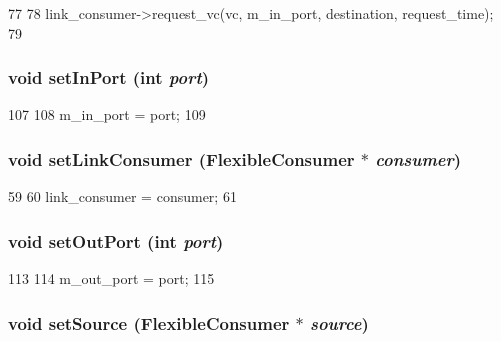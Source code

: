\begin{DoxyCode}
77 {
78     link_consumer->request_vc(vc, m_in_port, destination, request_time);
79 }
\end{DoxyCode}
\hypertarget{classNetworkLink_a1ec0cbfcb39559c3f6262ad360d910b4}{
\subsubsection[{setInPort}]{\setlength{\rightskip}{0pt plus 5cm}void setInPort (int {\em port})}}
\label{classNetworkLink_a1ec0cbfcb39559c3f6262ad360d910b4}



\begin{DoxyCode}
107 {
108     m_in_port = port;
109 }
\end{DoxyCode}
\hypertarget{classNetworkLink_ad25cd0a8bd8cc04be12bdcfee67aa808}{
\subsubsection[{setLinkConsumer}]{\setlength{\rightskip}{0pt plus 5cm}void setLinkConsumer ({\bf FlexibleConsumer} $\ast$ {\em consumer})}}
\label{classNetworkLink_ad25cd0a8bd8cc04be12bdcfee67aa808}



\begin{DoxyCode}
59 {
60     link_consumer = consumer;
61 }
\end{DoxyCode}
\hypertarget{classNetworkLink_a6e1fcbbdee4eeca176ab6b03b6c19ee9}{
\subsubsection[{setOutPort}]{\setlength{\rightskip}{0pt plus 5cm}void setOutPort (int {\em port})}}
\label{classNetworkLink_a6e1fcbbdee4eeca176ab6b03b6c19ee9}



\begin{DoxyCode}
113 {
114     m_out_port = port;
115 }
\end{DoxyCode}
\hypertarget{classNetworkLink_aa12b98c270affe16e12b505ffba35e7c}{
\subsubsection[{setSource}]{\setlength{\rightskip}{0pt plus 5cm}void setSource ({\bf FlexibleConsumer} $\ast$ {\em source})}}
\label{classNetworkLink_aa12b98c270affe16e12b505ffba35e7c}



